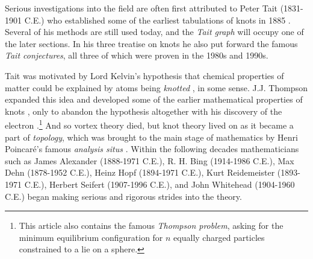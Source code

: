 \par\hfill\par
Serious investigations into the field are often first attributed to Peter Tait
(1831-1901 C.E.) who established some of the earliest tabulations of knots
in 1885 \cite{TaitOnKnots1885}. Several of his methods are still used today,
and the \textit{Tait graph} will occupy one of the later sections.
In his three treatise on knots he also put forward the famous
\textit{Tait conjectures}, all three of which were proven in the 1980s and
1990s.
\par\hfill\par
Tait was motivated by Lord Kelvin's hypothesis that chemical properties
of matter could be explained by atoms being \textit{knotted}
\cite{ThompsonVortex1867}, in some sense. J.J. Thompson expanded this idea and
developed some of the earlier mathematical properties of knots
\cite{ThompsonVortexRings1883}, only to abandon the hypothesis altogether with
his discovery of the electron \cite{ThompsonStructureOfAtoms1904}.\footnote{%
    This article also contains the famous \textit{Thompson problem}, asking for
    the minimum equilibrium configuration for $n$ equally charged particles
    constrained to a lie on a sphere.
}
And so vortex theory died, but knot theory lived on as it became a part of
\textit{topology}, which was brought to the main stage of mathematics
by Henri Poincar\'{e}'s famous \textit{analysis situs}
\cite{PoincareAnalysisSitus1895}. Within the following decades mathematicians
such as James Alexander (1888-1971 C.E.), R. H. Bing (1914-1986 C.E.),
Max Dehn (1878-1952 C.E.), Heinz Hopf (1894-1971 C.E.),
Kurt Reidemeister (1893-1971 C.E.), Herbert Seifert (1907-1996 C.E.),
and John Whitehead (1904-1960 C.E.) began making serious and rigorous strides
into the theory.
